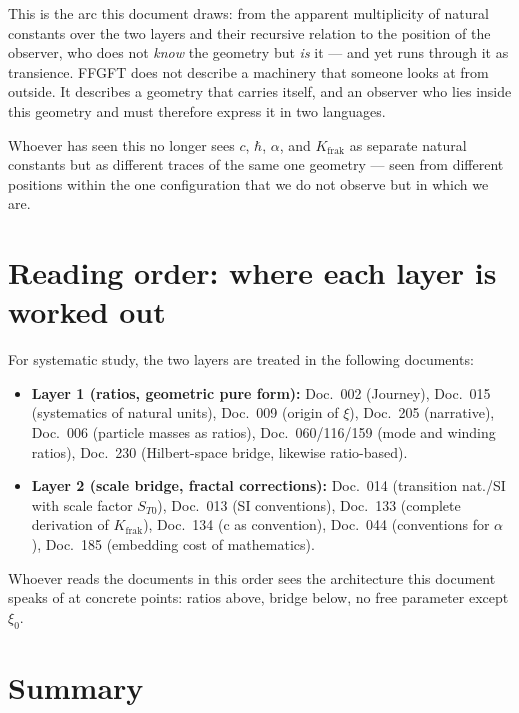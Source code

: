 \medskip

This is the arc this document draws: from the apparent multiplicity
of natural constants over the two layers and their recursive
relation to the position of the observer, who does not \emph{know}
the geometry but \emph{is} it --- and yet runs through it as
transience. FFGFT does not describe a machinery that someone looks at
from outside. It describes a geometry that carries itself, and an
observer who lies inside this geometry and must therefore express it
in two languages.

Whoever has seen this no longer sees $c$, $\hbar$, $\alpha$, and
$K_{\mathrm{frak}}$ as separate natural constants but as different
traces of the same one geometry --- seen from different positions
within the one configuration that we do not observe but in which we are.

\section{Reading order: where each layer is worked out}

For systematic study, the two layers are treated in the following
documents:

\begin{itemize}\setlength\itemsep{0pt}
  \item \textbf{Layer 1 (ratios, geometric pure form):}
    Doc.~002 (Journey), Doc.~015 (systematics of natural units),
    Doc.~009 (origin of $\xi$), Doc.~205 (narrative),
    Doc.~006 (particle masses as ratios),
    Doc.~060/116/159 (mode and winding ratios),
    Doc.~230 (Hilbert-space bridge, likewise ratio-based).
  \item \textbf{Layer 2 (scale bridge, fractal corrections):}
    Doc.~014 (transition nat./SI with scale factor $S_{T0}$),
    Doc.~013 (SI conventions), Doc.~133 (complete derivation of
    $K_{\mathrm{frak}}$), Doc.~134 (c as convention),
    Doc.~044 (conventions for $\alpha$), Doc.~185 (embedding cost of mathematics).
\end{itemize}

Whoever reads the documents in this order sees the architecture this
document speaks of at concrete points: ratios above, bridge below, no
free parameter except $\xi_{0}$.

\section*{Summary}

